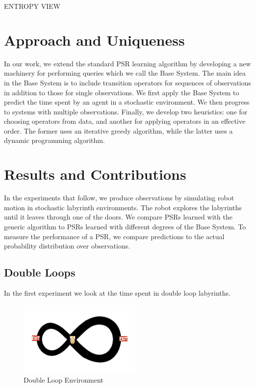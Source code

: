 \documentclass{acm_proc_article-sp}
\begin{document}
ENTROPY VIEW

\section{Approach and Uniqueness} 

In our work, we extend the standard PSR learning algorithm by developing a new machinery for performing queries which we call the Base System. The main idea in the Base System is to include transition operators for sequences of observations in addition to those for single observations. We first apply the Base System to predict the time spent by an agent in a stochastic environment. We then progress to systems with multiple observations. Finally, we develop two heuristics: one for choosing operators from data, and another for applying operators in an effective order. The former uses an iterative greedy algorithm, while the latter uses a dynamic programming algorithm.

\section{Results and Contributions}

In the experiments that follow, we produce observations by simulating robot motion in stochastic labyrinth environments. The robot explores the labyrinths until it leaves through one of the doors. We compare PSRs learned with the generic algorithm to PSRs learned with different degrees of the Base System. To measure the performance of a PSR, we compare predictions to the actual probability distribution over observations.

\subsection{Double Loops}

In the first experiment we look at the time spent in double loop labyrinths. 


\begin{figure}[ht!]
\centering
\includegraphics[width=60mm]{lucasplots/monImages/doubleLoopImage.png}
\caption{Double Loop Environment\label{overflow}}
\end{figure}
\end{document}
